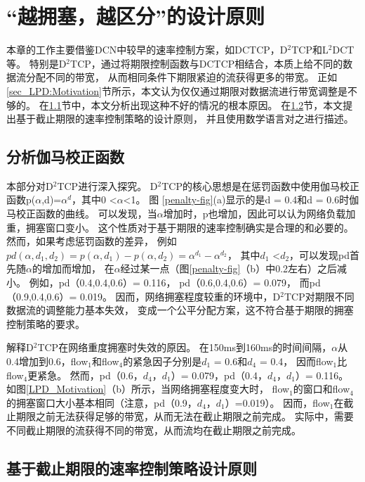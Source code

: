  
 \section{“越拥塞，越区分”的设计原则}
 \label{sec_LPD:MORE_LOAD}
 本章的工作主要借鉴DCN中较早的速率控制方案，如DCTCP，D$^2$TCP和L$^2$DCT等。
 特别是D$^2$TCP，通过将期限控制函数与DCTCP相结合，本质上给不同的数据流分配不同的带宽，
 从而相同条件下期限紧迫的流获得更多的带宽。
 正如\ref{sec_LPD:Motivation}节所示，本文认为仅仅通过期限对数据流进行带宽调整是不够的。 
 在\ref{sec_LPD:gamma}节中，本文分析出现这种不好的情况的根本原因。 
 在\ref{sec_LPD:principle}节，本文提出基于截止期限的速率控制策略的设计原则，
 并且使用数学语言对之进行描述。
 
\subsection{分析伽马校正函数}
\label{sec_LPD:gamma}

本部分对D$^2$TCP进行深入探究。
D$^2$TCP的核心思想是在惩罚函数中使用伽马校正函数p($\alpha$,d)=$\alpha^d$，其中0 <$\alpha$<1。
图 \ref{penalty-fig}(a)显示的是d = 0.4和d = 0.6时伽马校正函数的曲线。
可以发现，当$\alpha$增加时，p也增加，因此可以认为网络负载加重，拥塞窗口变小。
这个性质对于基于期限的速率控制确实是合理的和必要的。
然而，如果考虑惩罚函数的差异，
例如$pd(\alpha, d_{1}, d_{2})=p(\alpha, d_{1})-p(\alpha,d_{2})=\alpha^{d_{1}}-\alpha^{d_{2}}$，
其中$d_{1}$ <$d_{2}$，可以发现pd首先随$\alpha$的增加而增加，
在$\alpha$经过某一点（图\ref{penalty-fig}（b）中0.2左右）之后减小。
例如，pd（0.4,0.4,0.6）= 0.116，
pd（0.6,0.4,0.6）= 0.079，
而pd（0.9,0.4,0.6）= 0.019。
因而，网络拥塞程度较重的环境中，D$^2$TCP对期限不同数据流的调整能力基本失效，
变成一个公平分配方案，这不符合基于期限的拥塞控制策略的要求。
 
 
 解释D$^2$TCP在网络重度拥塞时失效的原因。
在150ms到160ms的时间间隔，$\alpha$从0.4增加到0.6，flow$_1$和flow$_4$的紧急因子分别是$d_1$ = 0.6和$d_4$ = 0.4，
因而flow$_1$比flow$_4$更紧急。
然而，pd（0.6，$d_4$，$d_1$）= 0.079，pd（0.4，$d_4$，$d_1$）= 0.116。 
如图\ref{LPD_Motivation}（b）所示，当网络拥塞程度变大时，
flow$_1$的窗口和flow$_4$的拥塞窗口大小基本相同（注意，pd（0.9，$d_4$，$d_1$）=0.019）。 
因而，flow$_1$在截止期限之前无法获得足够的带宽，从而无法在截止期限之前完成。
实际中，需要不同截止期限的流获得不同的带宽，从而流均在截止期限之前完成。


\subsection{基于截止期限的速率控制策略设计原则}
\label{sec_LPD:principle}

